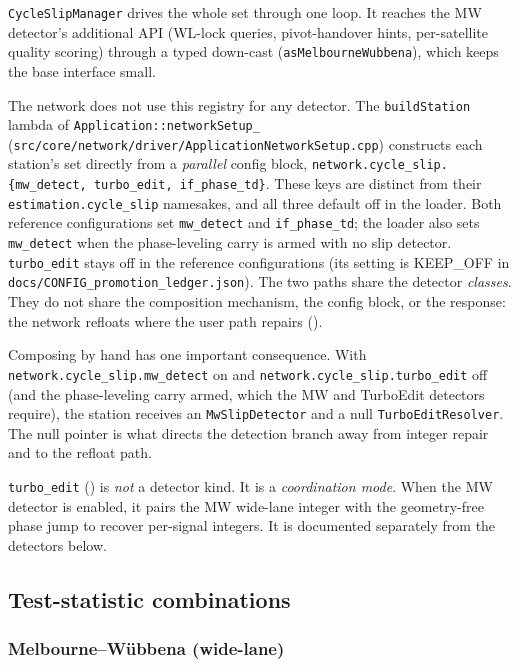 \documentclass[main.tex]{subfiles}
\begin{document}
\texttt{CycleSlipManager} drives the whole set through one loop.  It
reaches the MW detector's additional API (WL-lock queries,
pivot-handover hints, per-satellite quality scoring) through a typed
down-cast (\texttt{asMelbourneWubbena}), which keeps the base interface
small.

The network does not use this registry for any detector.  The
\texttt{buildStation} lambda of \texttt{Application::networkSetup\_}
(\texttt{src/core/network/driver/ApplicationNetworkSetup.cpp}) constructs
each station's set directly from a \emph{parallel} config block,
\texttt{network.cycle\_slip.\{mw\_detect, turbo\_edit, if\_phase\_td\}}.
These keys are distinct from their \texttt{estimation.cycle\_slip}
namesakes, and all three default off in the loader.  Both reference
configurations set \texttt{mw\_detect} and \texttt{if\_phase\_td}; the
loader also sets \texttt{mw\_detect} when the phase-leveling carry is armed
with no slip detector.  \texttt{turbo\_edit} stays off in the reference
configurations (its setting is KEEP\_OFF in
\texttt{docs/CONFIG\_promotion\_ledger.json}).  The two paths share the
detector \emph{classes}.  They do not share the composition mechanism, the
config block, or the response: the network refloats where the user path
repairs ().

Composing by hand has one important consequence.  With
\texttt{network.cycle\_slip.mw\_detect} on and
\texttt{network.cycle\_slip.turbo\_edit} off (and the phase-leveling carry
armed, which the MW and TurboEdit detectors require), the station receives
an \texttt{MwSlipDetector} and a null \texttt{TurboEditResolver}.  The null
pointer is what directs the detection branch away from integer repair
and to the refloat path.

\texttt{turbo\_edit} () is \emph{not} a detector
kind.  It is a \emph{coordination mode}.  When the MW detector is
enabled, it pairs the MW wide-lane integer with the geometry-free phase
jump to recover per-signal integers.  It is documented separately from
the detectors below.

\subsection{Test-statistic combinations}\label{sec:slip-combos}

\subsubsection{Melbourne--W\"ubbena (wide-lane)}\label{sec:slip-mw}
\end{document}

